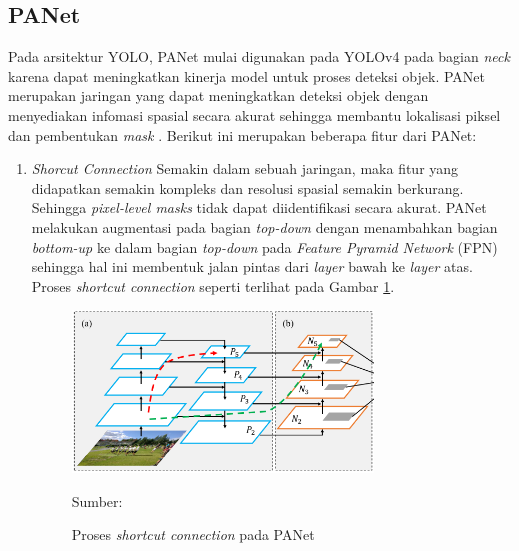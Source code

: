     \subsection{PANet}
    Pada arsitektur YOLO, PANet mulai digunakan pada YOLOv4 pada bagian \textit{neck} karena dapat meningkatkan kinerja model untuk proses deteksi objek. PANet merupakan jaringan yang dapat meningkatkan deteksi objek dengan menyediakan infomasi spasial secara akurat sehingga membantu lokalisasi piksel dan pembentukan \textit{mask} \citep{Liu2018}. Berikut ini merupakan beberapa fitur dari PANet:
    \begin{enumerate}
        \item \textit{Shorcut Connection}
        Semakin dalam sebuah jaringan, maka fitur yang didapatkan semakin kompleks dan resolusi spasial semakin berkurang. Sehingga \textit{pixel-level masks} tidak dapat diidentifikasi secara akurat. PANet melakukan augmentasi pada bagian \textit{top-down} dengan menambahkan bagian \textit{bottom-up} ke dalam bagian \textit{top-down} pada \textit{Feature Pyramid Network} (FPN) sehingga hal ini membentuk jalan pintas dari \textit{layer} bawah ke \textit{layer} atas. Proses \textit{shortcut connection} seperti terlihat pada Gambar \ref{fig:short-conn}.
        \begin{figure}[H]
            \begin{center}
                \includegraphics[width=8cm]{../img/PANet Shortcut Connection - Latex.png}
                \caption{Proses \textit{shortcut connection} pada PANet}
                \label{fig:short-conn}
                Sumber: \citep{Liu2018}
            \end{center}
        \end{figure}


\end{enumerate}
